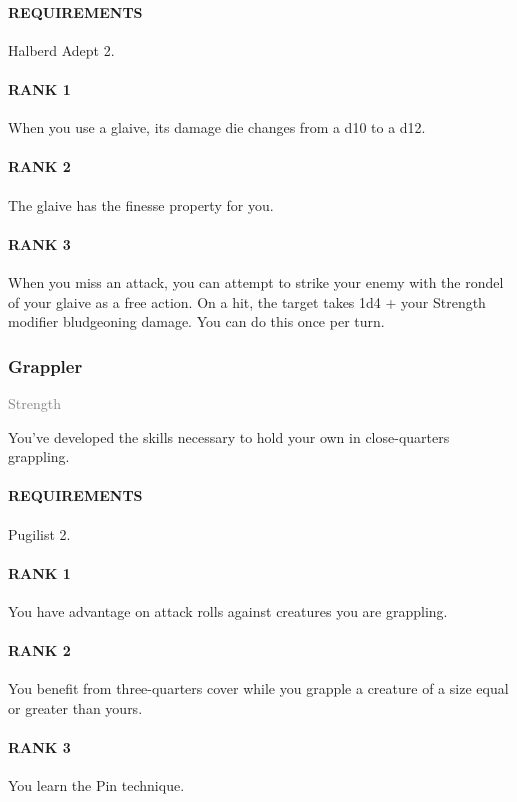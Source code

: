 \paragraph{REQUIREMENTS} Halberd Adept 2.
\paragraph{RANK 1} When you use a glaive, its damage die changes from a d10 to a d12.
\paragraph{RANK 2} The glaive has the finesse property for you.
\paragraph{RANK 3} When you miss an attack, you can attempt to strike your enemy with the rondel of your glaive as a free action.
On a hit, the target takes 1d4 + your Strength modifier bludgeoning damage.
You can do this once per turn.

\subsubsection{Grappler} \label{feat::grappler}
\small{\textcolor{gray}{Strength}}

\normalsize
You've developed the skills necessary to hold your own in close-quarters grappling.
\paragraph{REQUIREMENTS} Pugilist 2.
\paragraph{RANK 1} You have advantage on attack rolls against creatures you are grappling.
\paragraph{RANK 2} You benefit from three-quarters cover while you grapple a creature of a size equal or greater than yours.
\paragraph{RANK 3} You learn the Pin technique.

